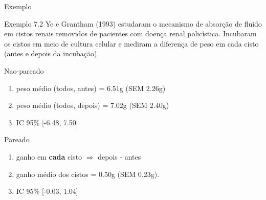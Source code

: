 \documentclass{beamer}
\begin{document}
\begin{frame}{Exemplo}
  \begin{exampleblock}{Exemplo 7.2}
    \footnotesize
    Ye e Grantham (1993) estudaram o mecanismo de absorção de fluido em  cistos renais removidos de pacientes com doença renal policística.
    Incubaram os cistos em meio de cultura celular e mediram a diferença de peso em cada cisto (antes e depois da incubação).

    \scriptsize
    \begin{exampleblock}{Nao-pareado}
      \begin{enumerate}
      \item peso médio (todos, antes) = 6.51g (SEM 2.26g)
      \item peso médio (todos, depois) = 7.02g (SEM 2.40g)
      \item IC 95\% [-6.48, 7.50]
      \end{enumerate}
    \end{exampleblock}
    \begin{exampleblock}{Pareado}
      \begin{enumerate}
      \item ganho em {\bf cada} cisto $\Rightarrow$ depois - antes
      \item ganho médio dos cistos = 0.50g (SEM 0.23g).
      \item IC 95\% [-0.03, 1.04]
      \end{enumerate}
    \end{exampleblock}
  \end{exampleblock}
\end{frame}
\end{document}
